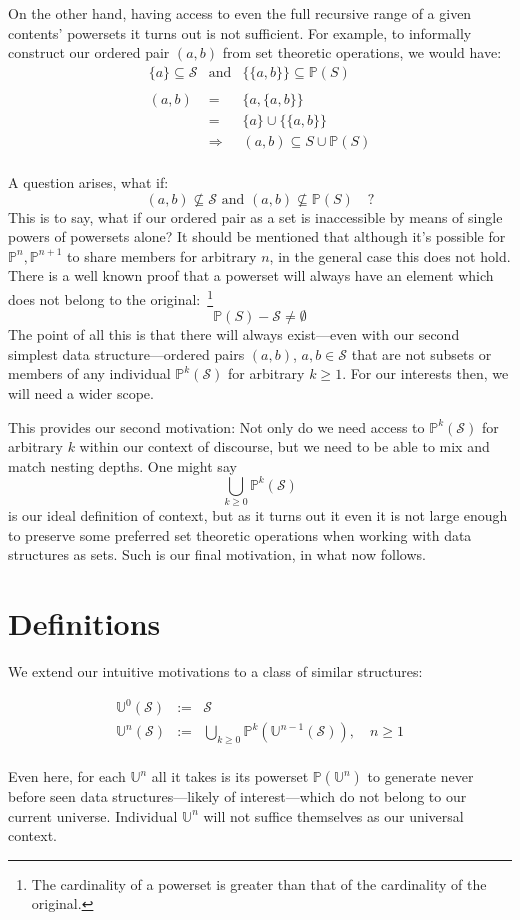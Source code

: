 \documentclass[twoside]{article}
\newcommand{\powerset}[2][P]{\ensuremath{\mathbb{#1}(#2)}}
\newcommand{\nthps}[2][P]{\ensuremath{\mathbb{#1}^{#2}}}
\newcommand{\nthus}[2][U]{\ensuremath{\mathbb{#1}^{#2}}}
\newcommand{\psunion}[2][P]{\ensuremath{\bigcup_{#2\ge 0}\mathbb{#1}^{#2}}}
\newcommand{\of}[1]{\ensuremath{(\mathcal{#1})}}
\newenvironment{definition}[1][Definition]{\begin{trivlist}
\item[\hskip \labelsep {\bfseries #1:}]}{\end{trivlist}}
\begin{document}
\newpage

On the other hand, having access to even the full recursive range of a given contents' powersets it turns out is not
sufficient.  For example, to informally construct our ordered pair $ (a,b) $ from set theoretic operations, we would have:
\begin{eqnarray*}
\{a\}\subseteq \mathcal{S} & \mbox{and} & \{\{a,b\}\}\subseteq\powerset{S} \\
 & & \\
(a,b) & = & \{a,\{a,b\}\} \\
 & = & \{a\}\cup\{\{a,b\}\} \\
 & \Longrightarrow & (a,b)\subseteq S\cup\powerset{S} \\
\end{eqnarray*}

A question arises, what if:
$$ (a,b)\not\subseteq\mathcal{S}\mbox{ and }(a,b)\not\subseteq\powerset{S}\quad ? $$
This is to say, what if our ordered pair as a set is inaccessible by means of single powers of powersets alone?
It should be mentioned that although it's possible for $ \nthps{n}, \nthps{n+1} $ to share members for arbitrary
$ n $, in the general case this does not hold. There is a well known proof that a powerset will always have an
element which does not belong to the
original:\ \footnote{The cardinality of a powerset is greater than that of the cardinality of the original.}
$$ \powerset{S}-\mathcal{S}\neq\emptyset $$
The point of all this is that there will always exist---even with our second simplest data structure---ordered
pairs $ (a,b) $, $ a,b\in\mathcal{S} $ that are not subsets or members of any individual $ \nthps{k}\of{S} $ for arbitrary
$ k\ge 1 $. For our interests then, we will need a wider scope.

This provides our second motivation: Not only do we need access to $ \nthps{k}\of{S} $ for arbitrary $ k $
within our context of discourse, but we need to be able to mix and match nesting depths. One might say
$$ \psunion{k}\of{S} $$
is our ideal definition of context, but as it turns out it even it is not large enough to preserve some preferred
set theoretic operations when working with data structures as sets. Such is our final motivation, in what now follows.

\section*{Definitions}

We extend our intuitive motivations to a class of similar structures:
\begin{definition}[Unified Powersets]
\begin{eqnarray*}
\nthus{0}\of{S} & := & \mathcal{S} \\
\nthus{n}\of{S} & := & \psunion{k}(\nthus{n-1}\of{S}),\quad n\ge 1 \\
\end{eqnarray*}
\end{definition}
Even here, for each $ \nthus{n} $ all it takes is its powerset $ \powerset{\nthus{n}} $ to generate never before seen
data structures---likely of interest---which do not belong to our current universe. Individual $ \nthus{n} $ will not suffice
themselves as our universal context.
\end{document}
